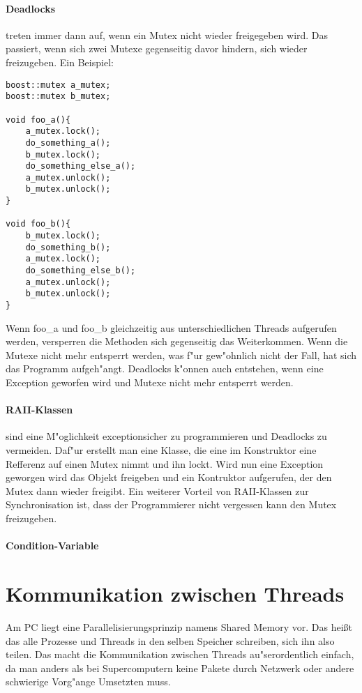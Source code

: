 \documentclass[14pt, a4paper]{report}
\begin{document}
\paragraph{Deadlocks} treten immer dann auf, wenn ein Mutex nicht wieder freigegeben 
wird. Das passiert, wenn sich zwei Mutexe gegenseitig davor hindern, sich wieder 
freizugeben. Ein Beispiel:
\begin{lstlisting}
boost::mutex a_mutex;
boost::mutex b_mutex;

void foo_a(){
	a_mutex.lock();
	do_something_a();
	b_mutex.lock();
	do_something_else_a();
	a_mutex.unlock();
	b_mutex.unlock();
}

void foo_b(){
	b_mutex.lock();
	do_something_b();
	a_mutex.lock();
	do_something_else_b();
	a_mutex.unlock();
	b_mutex.unlock();
}
\end{lstlisting}
Wenn foo\_a und foo\_b gleichzeitig aus unterschiedlichen Threads aufgerufen werden, 
versperren die Methoden sich gegenseitig das Weiterkommen. Wenn die Mutexe nicht mehr
entsperrt werden, was f"ur gew"ohnlich nicht der Fall, hat sich das Programm
aufgeh"angt. Deadlocks k"onnen auch entstehen, wenn eine Exception geworfen wird und
Mutexe nicht mehr entsperrt werden.

\paragraph{RAII-Klassen} sind eine M"oglichkeit exceptionsicher zu programmieren und 
Deadlocks zu vermeiden. Daf"ur erstellt man eine Klasse, die eine im Konstruktor eine 
Refferenz auf einen Mutex nimmt und ihn lockt. Wird nun eine Exception geworgen wird
das Objekt freigeben und ein Kontruktor aufgerufen, der den Mutex dann wieder freigibt.
Ein weiterer Vorteil von RAII-Klassen zur Synchronisation ist, dass der Programmierer 
nicht vergessen kann den Mutex freizugeben.

\paragraph{Condition-Variable}

\section{Kommunikation zwischen Threads}
Am PC liegt eine Parallelisierungsprinzip namens Shared Memory vor. Das heißt das alle
Prozesse und Threads in den selben Speicher schreiben, sich ihn also teilen. Das macht
die Kommunikation zwischen Threads au"serordentlich einfach, da man anders als bei
Supercomputern keine Pakete durch Netzwerk oder andere schwierige Vorg"ange Umsetzten
muss. 
\end{document}
